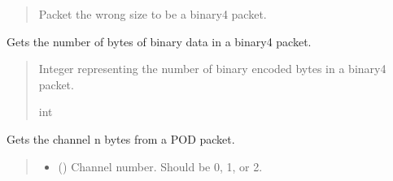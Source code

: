 \documentclass[letterpaper,10pt,english]{sphinxmanual}
\begin{document}
\begin{fulllineitems}
\begin{fulllineitems}
\begin{quote}
\begin{description}
\sphinxAtStartPar
{} \textendash{} Packet the wrong size to be a binary4 packet.

\end{description}\end{quote}

\end{fulllineitems}


\begin{fulllineitems}
\label{\detokenize{Morelia.Packets:Morelia.Packets.Binary4.PacketBinary4.GetBinaryLength}}
\pysigstartsignatures
{}
\pysigstopsignatures
\sphinxAtStartPar
Gets the number of bytes of binary data in a binary4 packet.
\begin{quote}\begin{description}
\sphinxAtStartPar
Integer representing the number of binary encoded bytes in a binary4 packet.

\sphinxAtStartPar
int

\end{description}\end{quote}

\end{fulllineitems}


\begin{fulllineitems}
\label{\detokenize{Morelia.Packets:Morelia.Packets.Binary4.PacketBinary4.GetCh}}
\pysigstartsignatures
{}
\pysigstopsignatures
\sphinxAtStartPar
Gets the channel n bytes from a POD packet.
\begin{quote}\begin{description}
\begin{itemize}
\item {} 
\sphinxAtStartPar
{} () \textendash{} Channel number. Should be 0, 1, or 2.


\end{itemize}
\end{description}
\end{quote}
\end{fulllineitems}
\end{fulllineitems}
\end{document}
